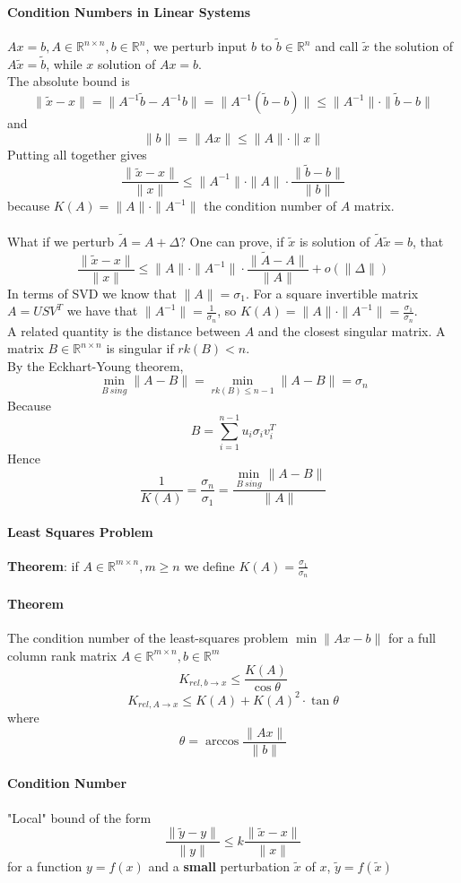 \documentclass[10pt]{report}
\begin{document}
\paragraph{Condition Numbers in Linear Systems}
$Ax = b, A\in \mathbb{R}^{n\times n}, b\in \mathbb{R}^n$, we perturb input $b$ to $\tilde{b}\in \mathbb{R}^n$ and call $\tilde{x}$ the solution of $A\tilde{x} = \tilde{b}$, while $x$ solution of $Ax=b$.\\
The absolute bound is $$\|\tilde{x}-x\| = \|A^{-1}\tilde{b} - A^{-1}b\| = \|A^{-1}(\tilde{b}-b)\|\leq \|A^{-1}\|\cdot \|\tilde{b}-b\|$$ and $$\|b\| = \|Ax\| \leq \|A\|\cdot\|x\|$$Putting all together gives $$\frac{\|\tilde{x} - x\|}{\|x\|} \leq \|A^{-1}\|\cdot\|A\|\cdot\frac{\|\tilde{b}-b\|}{\|b\|}$$ because $K(A) = \|A\|\cdot\|A^{-1}\|$ the condition number of $A$ matrix.\\\\
What if we perturb $\tilde{A} = A + \Delta$? One can prove, if $\tilde{x}$ is solution of $\tilde{A}\tilde{x} = b$, that $$\frac{\|\tilde{x} - x\|}{\|x\|} \leq \|A\|\cdot\|A^{-1}\|\cdot\frac{\|\tilde{A}-A\|}{\|A\|}+o(\|\Delta\|)$$
In terms of SVD we know that $\|A\| = \sigma_1$. For a square invertible matrix $A=USV^T$ we have that $\|A^{-1}\| = \frac{1}{\sigma_n}$, so $K(A) = \|A\|\cdot\|A^{-1}\| = \frac{\sigma_1}{\sigma_n}$.\\
A related quantity is the distance between $A$ and the closest singular matrix. A matrix $B\in \mathbb{R}^{n\times n}$ is singular if $rk(B)<n$.\\
By the Eckhart-Young theorem, $$\min_{B\:sing}\|A-B\| = \min_{rk(B)\leq n-1}\|A-B\| = \sigma_n$$ Because $$B=\sum_{i=1}^{n-1} u_i\sigma_iv_i^T$$ Hence $$\frac{1}{K(A)} = \frac{\sigma_n}{\sigma_1} = \frac{\min\limits_{B\:sing}\|A-B\|}{\|A\|}$$
\paragraph{Least Squares Problem} \textbf{Theorem}: if $A\in \mathbb{R}^{m\times n}, m\geq n$ we define $K(A)=\frac{\sigma_1}{\sigma_n}$
\paragraph{Theorem} The condition number of the least-squares problem $\min\|Ax-b\|$ for a full column rank matrix $A\in \mathbb{R}^{m\times n},b\in \mathbb{R}^m$ $$K_{rel,b\rightarrow x }\leq \frac{K(A)}{\cos\theta}$$ $$K_{rel,A\rightarrow x} \leq K(A) + K(A)^2\cdot\tan\theta$$ where $$\theta=\arccos\frac{\|Ax\|}{\|b\|}$$
\paragraph{Condition Number} "Local" bound of the form $$\frac{\|\tilde{y} - y\|}{\|y\|} \leq k\frac{\|\tilde{x} - x\|}{\|x\|}$$ for a function $y=f(x)$ and a \textbf{small} perturbation $\tilde{x}$ of $x$, $\tilde{y} = f(\tilde{x})$
\pagebreak
\end{document}
